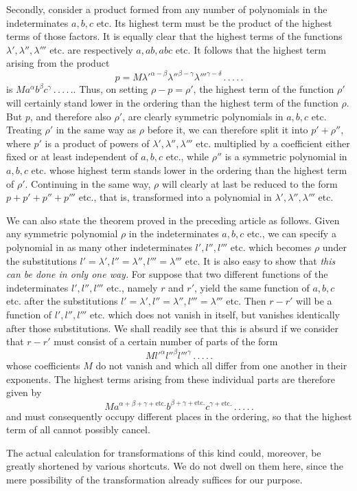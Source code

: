 Secondly, consider a product formed from any number of polynomials in the indeterminates $a,b,c$ etc. Its highest term must be the product of the highest terms of those factors. It is equally clear that the highest terms of the functions $\lambda',\lambda'',\lambda'''$ etc. are respectively $a,ab,abc$ etc. It follows that the highest term arising from the product
\[
p=M{\lambda'}^{\alpha-\beta}{\lambda''}^{\beta-\gamma}{\lambda'''}^{\gamma-\delta}\, .\, .\, .\, .\, .
\]
is $Ma^\alpha b^\beta c^\gamma\, .\, .\, .\, .\, .$. Thus, on setting $\rho-p=\rho'$, the highest term of the function $\rho'$ will certainly stand lower in the ordering than the highest term of the function $\rho$. But $p$, and therefore also $\rho'$, are clearly symmetric polynomials in $a,b,c$ etc. Treating $\rho'$ in the same way as $\rho$ before it, we can therefore split it into $p'+\rho''$, where $p'$ is a product of powers of $\lambda',\lambda'',\lambda'''$ etc. multiplied by a coefficient either fixed or at least independent of $a,b,c$ etc., while $\rho''$ is a symmetric polynomial in $a,b,c$ etc. whose highest term stands lower in the ordering than the highest term of $\rho'$. Continuing in the same way, $\rho$ will clearly at last be reduced to the form $p+p'+p''+p'''$ etc., that is, transformed into a polynomial in $\lambda',\lambda'',\lambda'''$ etc.

We can also state the theorem proved in the preceding article as follows. Given any symmetric polynomial $\rho$ in the indeterminates $a,b,c$ etc., we can specify a polynomial in as many other indeterminates $l',l'',l'''$ etc. which becomes
$\rho$ under the substitutions $l'=\lambda',l''=\lambda'',l'''=\lambda'''$ etc. It is also easy to show that \textit{this can be done in only one way.} For suppose that two different functions of the indeterminates $l',l'',l'''$ etc., namely $r$ and $r'$, yield the same function of $a,b,c$ etc. after the substitutions $l'=\lambda',l''=\lambda'',l'''=\lambda'''$ etc. Then $r-r'$ will be a function of $l',l'',l'''$ etc. which does not vanish in itself, but vanishes identically after those substitutions. We shall readily see that this is absurd if we consider that $r-r'$ must consist of a certain number of parts of the form
\[
M{l'}^\alpha{l''}^\beta{l'''}^\gamma\, .\, .\, .\, .\, .
\]
whose coefficients $M$ do not vanish and which all differ from one another in their exponents. The highest terms arising from these individual parts are therefore given by
\[
Ma^{\alpha+\beta+\gamma+\text{etc.}}b^{\beta+\gamma+\text{etc.}}c^{\gamma+\text{etc.}}\, .\, .\, .\, .\, .
\]
and must consequently occupy different places in the ordering, so that the highest term of all cannot possibly cancel.

The actual calculation for transformations of this kind could, moreover, be greatly shortened by various shortcuts. We do not dwell on them here, since the mere possibility of the transformation already suffices for our purpose.
